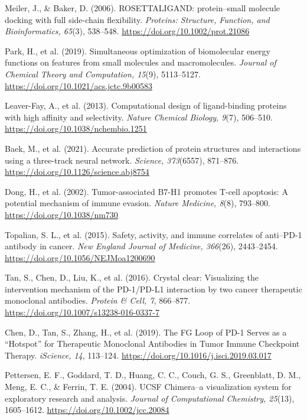 \documentclass[11pt]{article}
\begin{document}
\begin{thebibliography}{99}
 Meiler, J., \& Baker, D. (2006). ROSETTALIGAND: protein–small molecule docking with full side-chain flexibility. \textit{Proteins: Structure, Function, and Bioinformatics, 65}(3), 538--548. \url{https://doi.org/10.1002/prot.21086}

 Park, H., et al. (2019). Simultaneous optimization of biomolecular energy functions on features from small molecules and macromolecules. \textit{Journal of Chemical Theory and Computation, 15}(9), 5113--5127. \url{https://doi.org/10.1021/acs.jctc.9b00583}

 Leaver-Fay, A., et al. (2013). Computational design of ligand-binding proteins with high affinity and selectivity. \textit{Nature Chemical Biology, 9}(7), 506--510. \url{https://doi.org/10.1038/nchembio.1251}

 Baek, M., et al. (2021). Accurate prediction of protein structures and interactions using a three-track neural network. \textit{Science, 373}(6557), 871--876. \url{https://doi.org/10.1126/science.abj8754}

 Dong, H., et al. (2002). Tumor-associated B7-H1 promotes T-cell apoptosis: A potential mechanism of immune evasion. \textit{Nature Medicine, 8}(8), 793--800. \url{https://doi.org/10.1038/nm730}

 Topalian, S. L., et al. (2015). Safety, activity, and immune correlates of anti--PD-1 antibody in cancer. \textit{New England Journal of Medicine, 366}(26), 2443--2454. \url{https://doi.org/10.1056/NEJMoa1200690}

 Tan, S., Chen, D., Liu, K., et al. (2016). Crystal clear: Visualizing the intervention mechanism of the PD-1/PD-L1 interaction by two cancer therapeutic monoclonal antibodies. \textit{Protein \& Cell, 7}, 866--877. \url{https://doi.org/10.1007/s13238-016-0337-7}

 Chen, D., Tan, S., Zhang, H., et al. (2019). The FG Loop of PD-1 Serves as a “Hotspot” for Therapeutic Monoclonal Antibodies in Tumor Immune Checkpoint Therapy. \textit{iScience, 14}, 113--124. \url{https://doi.org/10.1016/j.isci.2019.03.017}

 Pettersen, E. F., Goddard, T. D., Huang, C. C., Couch, G. S., Greenblatt, D. M., Meng, E. C., \& Ferrin, T. E. (2004). UCSF Chimera--a visualization system for exploratory research and analysis. \textit{Journal of Computational Chemistry, 25}(13), 1605--1612. \url{https://doi.org/10.1002/jcc.20084}


\end{thebibliography}
\end{document}
